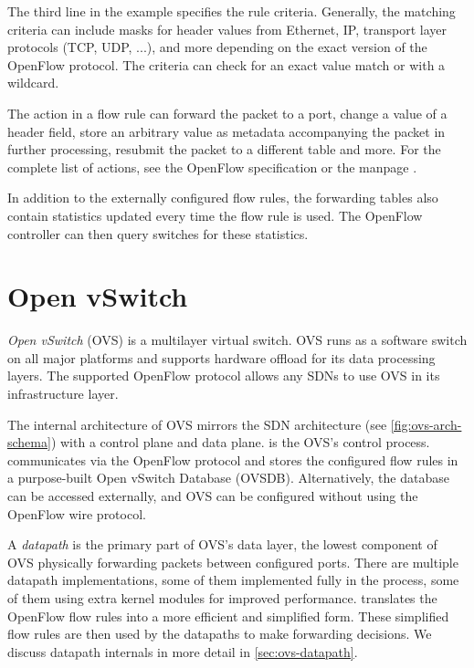 The third line in the example specifies the rule criteria. Generally, the matching criteria can include masks for header values from Ethernet, IP, transport layer protocols (TCP, UDP, ...), and more depending on the exact version of the OpenFlow protocol. The criteria can check for an exact value match or with a wildcard.

The action in a flow rule can forward the packet to a port, change a value of a header field, store an arbitrary value as metadata accompanying the packet in further processing, resubmit the packet to a different table and more. For the complete list of actions, see the OpenFlow specification \cite{OFSpec} or the  manpage \cite{OVSActionsMan}.

In addition to the externally configured flow rules, the forwarding tables also contain statistics updated every time the flow rule is used. The OpenFlow controller can then query switches for these statistics.

\section{Open vSwitch}
\label{sec:ovs}

\emph{Open vSwitch} (OVS) \cite{OVSWeb} \cite{OVSSource} \cite{KernelSource} is a multilayer virtual switch. OVS runs as a software switch on all major platforms and supports hardware offload for its data processing layers. The supported OpenFlow protocol allows any SDNs to use OVS in its infrastructure layer.

The internal architecture of OVS mirrors the SDN architecture (see \cref{fig:ovs-arch-schema}) with a control plane and data plane.  is the OVS's control process.  communicates via the OpenFlow protocol and stores the configured flow rules in a purpose-built Open vSwitch Database (OVSDB). Alternatively, the database can be accessed externally, and OVS can be configured without using the OpenFlow wire protocol.

A \emph{datapath} is the primary part of OVS's data layer, the lowest component of OVS physically forwarding packets between configured ports. There are multiple datapath implementations, some of them implemented fully in the  process, some of them using extra kernel modules for improved performance.  translates the OpenFlow flow rules into a more efficient and simplified form. These simplified flow rules are then used by the datapaths to make forwarding decisions. We discuss datapath internals in more detail in \cref{sec:ovs-datapath}.


